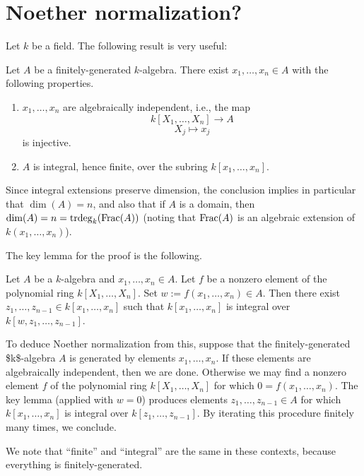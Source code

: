 \documentclass[10pt]{article}
\DeclareMathOperator{\trdeg}{trdeg}
\begin{document}
\section{Noether normalization?}
\label{sec:orgae6adf2}

Let \(k\) be a field.
The following result is very useful:
\begin{theorem}
  Let $A$ be a finitely-generated $k$-algebra.
  There exist
  $x_1,\dotsc,x_n \in A$ with the following properties.
  \begin{enumerate}
  \item $x_1,\dotsc,x_n$ are algebraically independent,
    i.e.,
    the map
    \[
      k[X_1,\dotsc,X_n] \rightarrow A
    \]
    \[
      X_j \mapsto x_j
    \]
    is injective.
  \item
    $A$ is integral, hence finite, over the subring
    $k[x_1,\dotsc,x_n]$.
  \end{enumerate}
\end{theorem}
Since integral extensions preserve
dimension,
the conclusion implies in particular
that \(\dim(A) = n\),
and also that if \(A\) is a domain,
then \(\dim(A) = n = \trdeg_k(\Frac(A))\)
(noting that \(\operatorname{Frac}(A)\) is an algebraic extension of \(k(x_1,\dotsc,x_n)\)).

The key lemma for the proof is the following.
\begin{lemma}
  Let $A$ be a $k$-algebra
  and $x_1,\dotsc,x_n \in A$.
  Let $f$ be a nonzero element
  of the polynomial ring
  $k[X_1,\dotsc,X_n]$.
  Set $w := f(x_1,\dotsc,x_n) \in A$.
  Then
  there exist $z_1,\dotsc,z_{n-1} \in k[x_1,\dotsc,x_n]$
  such that
  $k[x_1,\dotsc,x_n]$ is integral over $k[w,z_1,\dotsc,z_{n-1}]$.
\end{lemma}

To deduce Noether normalization from this,
suppose that the finitely-generated \$k\$-algebra \(A\) is
generated by elements \(x_1,\dotsc,x_n\).
If these elements are algebraically independent,
then we are done.
Otherwise we may find a nonzero element \(f\) of the polynomial
ring \(k[X_1,\dotsc,X_n]\)
for which \(0 = f(x_1,\dotsc,x_n)\).
The key lemma (applied with \(w = 0\)) produces elements \(z_1,\dotsc,z_{n-1} \in A\)
for which \(k[x_1,\dotsc,x_n]\) is integral over
\(k[z_1,\dotsc,z_{n-1}]\).
By iterating this procedure finitely many times, we conclude.

We note that ``finite'' and ``integral'' are the same in these contexts,
because everything is finitely-generated.
\end{document}

